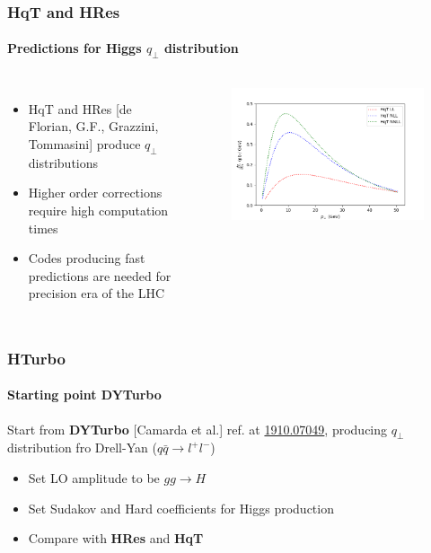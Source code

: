 \documentclass[aspectratio=43]{beamer}
\begin{document}
\begin{frame}

	\frametitle{HqT and HRes}
	\framesubtitle{Predictions for Higgs $q_{\perp}$ distribution}
	
	\begin{columns}
		
			
			\begin{itemize}
				\item HqT and HRes {\color{blue}[de Florian, G.F., Grazzini, Tommasini]} produce $q_{\perp}$ distributions
				\item Higher order corrections require {\color{red}high computation times}
				\item Codes producing fast predictions are needed for precision era of the LHC
			\end{itemize}

	
		\begin{figure}
			\includegraphics[width = 7 cm]{plots/higgs_qt_all.png}
		\end{figure}		
			
	\end{columns}

\end{frame}

\begin{frame}

\frametitle{HTurbo}
\framesubtitle{Starting point DYTurbo}
	
	Start from \textbf{DYTurbo} [Camarda et al.] ref. at {\color{blue} \href{https://arxiv.org/abs/1910.07049}{1910.07049}}, producing $q_{\perp}$ distribution fro Drell-Yan ($q\bar{q} \rightarrow l^{+}l^{-}$)
	
	\begin{itemize}
		\item Set LO amplitude to be $gg \rightarrow H$
		\item Set Sudakov and Hard coefficients for Higgs production
		\item Compare with \textbf{HRes} and \textbf{HqT}
	\end{itemize}

\end{frame}
\end{document}
